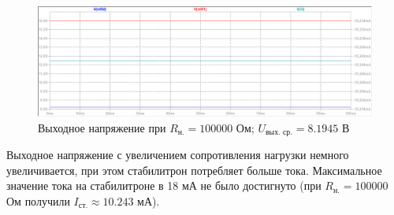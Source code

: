 \documentclass[a4paper, 12pt]{article}
\begin{document}
    \begin{figure}[H]
        \centering
        \includegraphics[scale=0.46]{1task_R100k.png}
        \captionsetup{skip=0pt}
        \caption{Выходное напряжение при $R_{\text{н.}}=100000$ Ом; $U_{\text{вых. ср.}}=8.1945$ В}
        \label{fig:1task_R100k}
    \end{figure}
    \noindent Выходное напряжение с увеличением сопротивления нагрузки немного увеличивается,
    при этом стабилитрон потребляет больше тока. Максимальное значение тока на стабилитроне в 18 мА
    не было достигнуто (при $R_{\text{н.}}=100000$ Ом получили $I_{\text{ст.}}\approx10.243$ мА).
\end{document}
